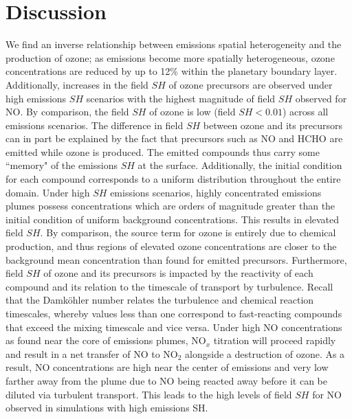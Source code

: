 
  
\section{Discussion}

We find an inverse relationship between emissions spatial heterogeneity and the production of ozone; as emissions become more spatially heterogeneous, ozone concentrations are reduced by up to 12\% within the planetary boundary layer. Additionally, increases in the field $SH$ of ozone precursors are observed under high emissions $SH$ scenarios with the highest magnitude of field $SH$ observed for NO. By comparison, the field $SH$ of ozone is low (field $SH<0.01$) across all emissions scenarios. The difference in field $SH$ between ozone and its precursors can in part be explained by the fact that precursors such as NO and HCHO are emitted while ozone is produced. The emitted compounds thus carry some ``memory" of the emissions $SH$ at the surface. Additionally, the initial condition for each compound corresponds to a uniform distribution throughout the entire domain. Under high $SH$ emissions scenarios, highly concentrated emissions plumes possess concentrations which are orders of magnitude greater than the initial condition of uniform background concentrations. This results in elevated field $SH$. By comparison, the source term for ozone is entirely due to chemical production, and thus regions of elevated ozone concentrations are closer to the background mean concentration than found for emitted precursors. Furthermore, field $SH$ of ozone and its precursors is impacted by the reactivity of each compound and its relation to the timescale of transport by turbulence. Recall that the Damköhler number relates the turbulence and chemical reaction timescales, whereby values less than one correspond to fast-reacting compounds that exceed the mixing timescale and vice versa. Under high NO concentrations as found near the core of emissions plumes, NO$_x$ titration will proceed rapidly and result in a net transfer of NO to NO$_2$ alongside a destruction of ozone. As a result, NO concentrations are high near the center of emissions and very low farther away from the plume due to NO being reacted away before it can be diluted via turbulent transport. This leads to the high levels of field $SH$ for NO observed in simulations with high emissions SH. 


